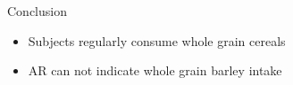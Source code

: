 \documentclass{beamer}
\begin{document}
\begin{frame}{Conclusion}
\begin{itemize}
	\item Subjects regularly consume whole grain cereals
	\item AR can not indicate whole grain barley intake
\end{itemize}

\end{frame}
\end{document}
